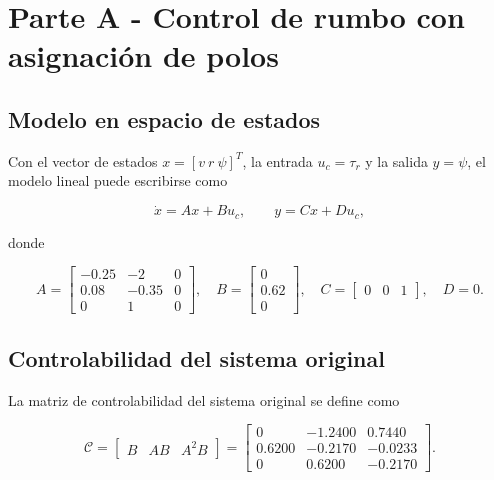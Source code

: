 \section{Parte A - Control de rumbo con asignación de polos}

\subsection{Modelo en espacio de estados}

Con el vector de estados $x = [v\ r\ \psi]^T$, la entrada $u_c = \tau_r$ y la salida $y = \psi$, el modelo lineal puede escribirse como

\begin{equation}
\dot{x} = A x + B u_c, \qquad y = Cx + Du_c,
\end{equation}

donde

\begin{equation}
A =
\begin{bmatrix}
-0.25 & -2 & 0 \\
0.08 & -0.35 & 0 \\
0 & 1 & 0
\end{bmatrix},
\quad
B =
\begin{bmatrix}
0 \\
0.62 \\
0
\end{bmatrix},
\quad
C =
\begin{bmatrix}
0 & 0 & 1
\end{bmatrix},
\quad
D = 0.
\end{equation}

\subsection{Controlabilidad del sistema original}

La matriz de controlabilidad del sistema original se define como

\begin{equation}
\mathcal{C} =
\begin{bmatrix}
B & AB & A^2B
\end{bmatrix}
=
\begin{bmatrix}
0 & -1.2400 & 0.7440 \\
0.6200 & -0.2170 & -0.0233 \\
0 & 0.6200 & -0.2170
\end{bmatrix}.
\label{eq:controlabilidad-original}
\end{equation}

